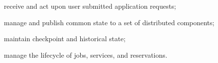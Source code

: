 \begin{description}
  \item receive and act upon user submitted application requests;
  \item manage and publish common state to a set of distributed components;
  \item maintain checkpoint and historical state;
  \item manage the lifecycle of jobs, services, and reservations.
\end{description}